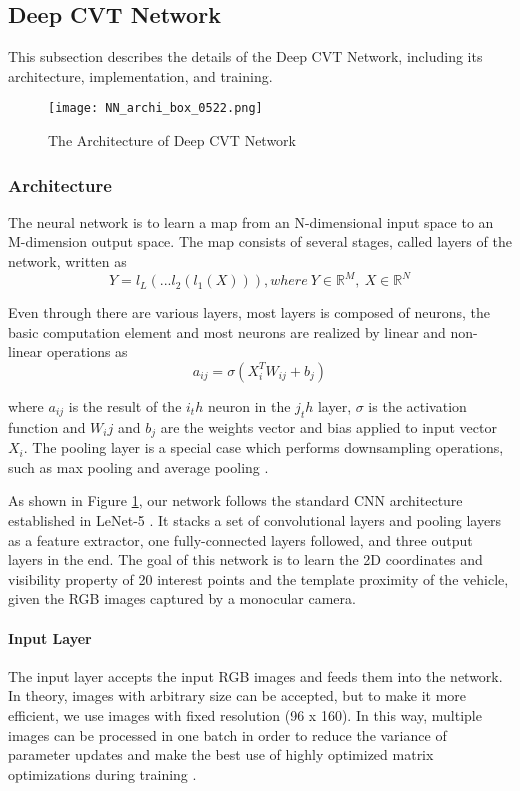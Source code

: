 \subsection{Deep CVT Network}
\label{network}
This subsection describes the details of the Deep CVT Network, including its architecture, implementation, and training.

\begin{figure}[h]		
	\texttt{[image: NN\_archi\_box\_0522.png]}
	\caption{The Architecture of Deep CVT Network}
	\centering
	\label{figure:nn_archi}
\end{figure}

\subsubsection{Architecture}
The neural network is to learn a map from an N-dimensional  input space to an M-dimension output space. The map consists of several stages, called layers of the network, written as
\begin{equation}
Y = l_L(...l_2(l_1(X))), where ~Y \in {\mathbb{R}^M}, ~X \in {\mathbb{R}^N}
\end{equation}

Even through there are various layers, most layers  is composed of neurons, the basic computation element and most neurons are realized by linear and non-linear operations as 
\begin{equation}
a_{ij} = \sigma(X_i^T W_{ij}+b_j)
\end{equation}

where $a_{ij}$ is the result of the $i_th$ neuron in the $j_th$ layer, $\sigma$ is the activation function and $W_ij$ and $b_j$ are the weights vector and bias applied to input vector $X_i$.  The pooling layer is a special case which performs downsampling operations, such as max pooling \cite{Boureau:2010} and average pooling \cite{6460871}.

As shown in Figure \ref{figure:nn_archi}, our network follows the standard CNN architecture established in LeNet-5 \cite{726791}. It stacks a set of convolutional layers and pooling layers as a feature extractor, \tbd one fully-connected layers followed, and three output layers in the end. The goal of this network is to learn the 2D coordinates and visibility property of 20 interest points and the template proximity of the vehicle, given the RGB images captured by a monocular camera.

\paragraph{Input Layer}
The input layer accepts the input RGB images and feeds them into the network. In theory, images with arbitrary size can be accepted, but to make it more efficient, we use images with fixed resolution (96 x 160).  In this way, multiple images can be processed in one batch in order to reduce the variance of parameter updates and make the best use of highly optimized matrix optimizations during training \cite{DBLP:journals/corr/Ruder16}.

